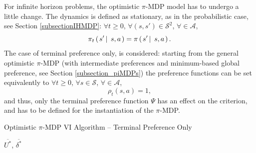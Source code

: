 For infinite horizon problems, the optimistic $\pi$-MDP model 
has to undergo a little change.
The dynamics is defined as stationary,
as in the probabilistic case, see Section \ref{subsectionIHMDP}:
$\forall t \geqslant 0$,
$\forall (s,s') \in \mathcal{S}^2$, $\forall \in \mathcal{A}$,
\[ \pi_t \left( \left.  s' \, \right| \left. \, s,a   \right. \right) = \pi \left( \left.  s' \, \right| \left. \, s,a   \right. \right). \]
The case of terminal preference only, is considered: 
starting from the general optimistic $\pi$-MDP 
(with intermediate preferences and minimum-based global preference,
see Section \ref{subsection_piMDPs}) 
the preference functions can be set equivalently to 
$\forall t \geqslant 0$, $\forall s \in \mathcal{S}$, $\forall \in \mathcal{A}$,
\[ \rho_t(s,a) = 1,\]
and thus, only the terminal preference function $\Psi$
has an effect on the criterion,
and has to be defined 
for the instantiation of the $\pi$-MDP.

\begin{algorithm} \caption{ Optimistic $\pi$-MDP VI Algorithm -- Terminal Preference Only} 
\label{algorithmIVPIMDP}
\Return $\overline{U^*}$, $\overline{\delta^*}$ \;
\end{algorithm}

